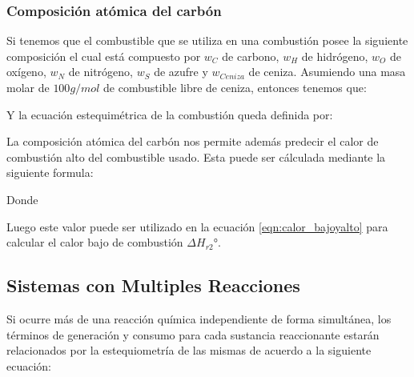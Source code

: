 \subsubsection{Composición atómica del carbón}

Si tenemos que el combustible que se utiliza en una combustión posee la siguiente composición  el cual está compuesto por $w_C$ de carbono, $w_H$ de hidrógeno, $w_O$ de oxígeno, $w_N$ de nitrógeno, $w_S$ de azufre y $w_{Ceniza}$ de ceniza. Asumiendo
una masa molar de $100 g/mol$ de combustible libre de ceniza, entonces tenemos que:


Y la ecuación estequimétrica de la combustión queda definida por:


La composición atómica del carbón nos permite además predecir el calor de combustión alto del combustible usado.
Esta puede ser cálculada mediante la siguiente formula:


Donde

Luego este valor puede ser utilizado en la ecuación \ref{eqn:calor_bajoyalto} para calcular el calor bajo de combustión $\Delta H_{r2}°$.

\subsection{Sistemas con Multiples Reacciones}

Si ocurre más de una reacción química independiente de forma simultánea, los términos de generación y consumo para cada sustancia reaccionante estarán relacionados por la estequiometría de las mismas de acuerdo a la siguiente ecuación:

